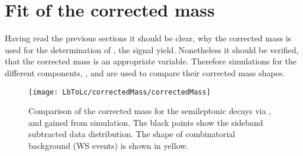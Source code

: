 \section{Fit of the \pKpi\mun corrected mass}
\label{sec:FitCorrectedMass}
Having read the previous sections it should be clear, why the corrected \pKpi\mun mass is used for the determination of \NLc, the \LbToLcmunu signal yield.
Nonetheless it should be verified, that the corrected \pKpi\mun mass is an appropriate variable.
Therefore simulations for the different components, \LbToLcmunu,  and  are used to compare their corrected \pKpi\mun mass shapes.
\begin{figure}[hptb]
	\centering
	\texttt{[image: LbToLc/correctedMass/correctedMass]}
	\caption{Comparison of the \pKpi\mun corrected mass for the semileptonic \Lb decays via \Lc,  and  gained from simulation. The black points show the sideband subtracted data distribution. The shape of combinatorial \Lc\mun background (WS events) is shown in yellow.}
	\label{fig:correctedMass_normalisation}
\end{figure}

